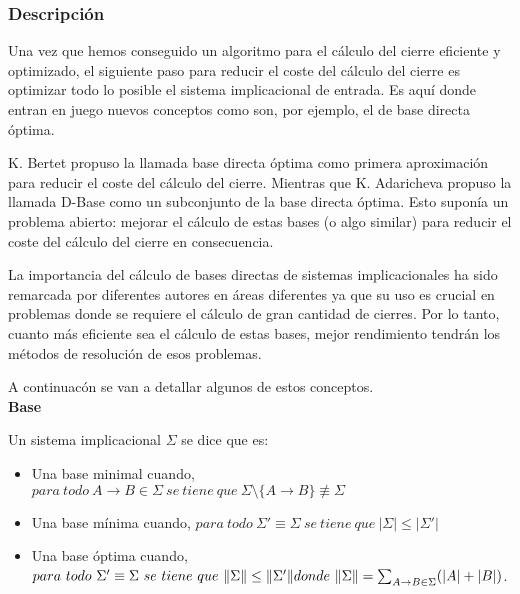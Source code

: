 \subsubsection{Descripci\'on} 


Una vez que hemos conseguido un algoritmo para el c\'alculo del cierre eficiente y optimizado, el siguiente paso para reducir el coste del c\'alculo del cierre es optimizar todo lo posible el sistema implicacional de entrada. Es aqu\'i donde entran en juego nuevos conceptos como son, por ejemplo, el de base directa \'optima.

K. Bertet \cite{BERTET20102155} propuso la llamada base directa \'optima como primera aproximaci\'on para reducir el coste del c\'alculo del cierre. Mientras que  K. Adaricheva \cite{Adaricheva} propuso la llamada D-Base como un subconjunto de la base directa \'optima. Esto supon\'ia un problema abierto: mejorar el c\'alculo de estas bases (o algo similar) para reducir el coste del c\'alculo del cierre en consecuencia.

La importancia del c\'alculo de bases directas de sistemas implicacionales ha sido remarcada por diferentes autores en \'areas diferentes ya que su uso es crucial en problemas donde se requiere el c\'alculo de gran cantidad de cierres. Por lo tanto, cuanto m\'as eficiente sea el c\'alculo de estas bases, mejor rendimiento tendr\'an los m\'etodos de resoluci\'on de esos problemas. 

A continuac\'on se van a detallar algunos de estos conceptos.\\


\textbf{Base}

Un sistema implicacional \( \Sigma \) se dice que es:
\begin{itemize}
    \item Una base minimal cuando,  \( para \ todo \ A \to B \in \Sigma \ se \ tiene \ que \ \Sigma \setminus \{A \to B\} \not\equiv \Sigma\)

    \item Una base m\'inima cuando,  \( para \ todo \ \Sigma' \equiv \Sigma \ se \ tiene \ que \ |\Sigma| \leq |\Sigma'|\)

    \item Una base \'optima cuando,  \( para \ todo \ \Sigma' \equiv \Sigma \ se \ tiene \ que \ \|\Sigma\| \leq \|\Sigma'\| \\ donde \ \|\Sigma\| = 
    \sum_{\substack{A \to B \in \Sigma}} (|A|+|B|) \).
\end{itemize}


